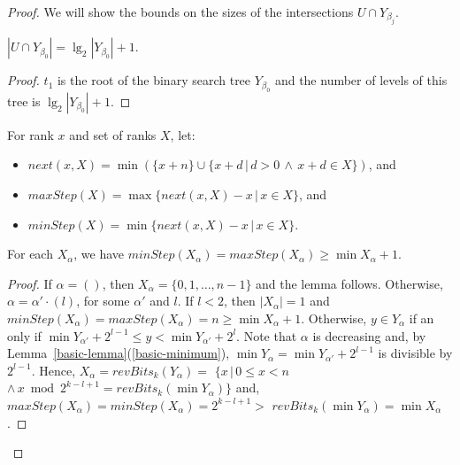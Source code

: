 \documentclass{llncs}
\begin{document}
\begin{proof}
We will show the bounds on the sizes of the intersections 
$U \cap Y_{\beta_j}$.
\begin{lemma}\label{first-level-lemma}
$|U \cap Y_{\beta_0}|=\lg_2 | Y_{\beta_0} |+1$.
\end{lemma}
% 
\begin{proof}
$t_1$ is the root of the binary search tree $Y_{\beta_0}$ and
the number of levels of this tree is $\lg_2 | Y_{\beta_0} |+1$.
\end{proof}


For rank $x$ and set of ranks $X$, 
let:
\begin{itemize}
\item
  $next(x,X)= \min(\{x+n\}\cup \{x+d\,|\, d>0\, \wedge\, x+d\in X\})$,
  and 
\item
  $maxStep(X)=\max\{ next(x,X)-x\,|\, x\in X\}$,
  and 
\item
  $minStep(X)=\min\{ next(x,X)-x\,|\, x\in X\}$.
\end{itemize}
\begin{lemma}\label{step-lemma}
For each %
$X_\alpha$,
we have $minStep(X_\alpha)=maxStep(X_\alpha)\ge \min X_\alpha+1$.
\end{lemma}
\begin{proof}
If $\alpha=()$, then $X_\alpha=\{0,1,\ldots, n-1\}$ and the lemma follows.
Otherwise, $\alpha=\alpha'\cdot(l)$, for some $\alpha'$ and $l$.
If $l<2$, then $|X_\alpha|=1$ and $minStep(X_\alpha)=maxStep(X_\alpha)=n\ge \min X_\alpha+1$.
Otherwise,
 $y\in Y_\alpha$ if an only if $\min Y_{\alpha'}+2^{l-1}\le y<\min Y_{\alpha'}+2^l$.
Note that $\alpha$ is decreasing and,
by Lemma~\ref{basic-lemma}(\ref{basic-minimum}), 
$\min Y_\alpha=\min Y_{\alpha'}+2^{l-1}$ is divisible by $2^{l-1}$.
Hence, 
$X_\alpha=revBits_k(Y_\alpha)=$ 
$\{x\,|\, 0\le x< n\,$
$\wedge\, x\bmod 2^{k-l+1}=revBits_k(\min Y_{\alpha})\}$
and, 
$maxStep(X_\alpha)=minStep(X_\alpha)=2^{k-l+1}> $
$revBits_k(\min Y_{\alpha})=\min X_\alpha $.
\end{proof}


\end{proof}
\end{document}
